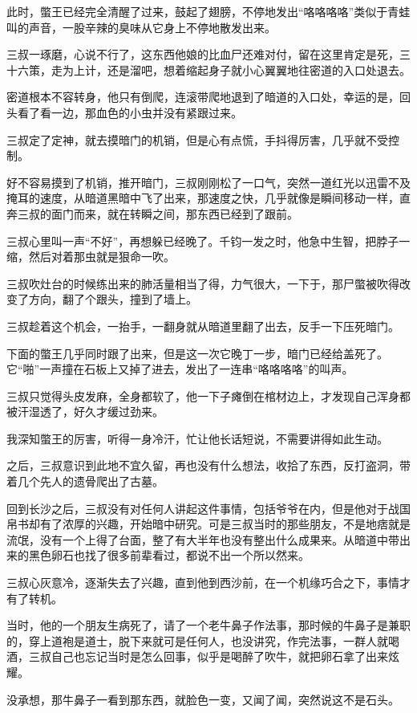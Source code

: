 此时，蟞王已经完全清醒了过来，鼓起了翅膀，不停地发出“咯咯咯咯”类似于青蛙叫的声音，一股辛辣的臭味从它身上不停地散发出来。

三叔一琢磨，心说不行了，这东西他娘的比血尸还难对付，留在这里肯定是死，三十六策，走为上计，还是溜吧，想着缩起身子就小心翼翼地往密道的入口处退去。

密道根本不容转身，他只有倒爬，连滚带爬地退到了暗道的入口处，幸运的是，回头看了看一边，那血色的小虫并没有紧跟过来。

三叔定了定神，就去摸暗门的机销，但是心有点慌，手抖得厉害，几乎就不受控制。

好不容易摸到了机销，推开暗门，三叔刚刚松了一口气，突然一道红光以迅雷不及掩耳的速度，从暗道黑暗中飞了出来，那速度之快，几乎就像是瞬间移动一样，直奔三叔的面门而来，就在转瞬之间，那东西已经到了跟前。

三叔心里叫一声“不好”，再想躲已经晚了。千钧一发之时，他急中生智，把脖子一缩，然后对着那虫就是狠命一吹。

三叔吹灶台的时候练出来的肺活量相当了得，力气很大，一下于，那尸蟞被吹得改变了方向，翻了个跟头，撞到了墙上。

三叔趁着这个机会，一抬手，一翻身就从暗道里翻了出去，反手一下压死暗门。

下面的蟞王几乎同时跟了出来，但是这一次它晚丁一步，暗门已经给盖死了。它“啪”一声撞在石板上又掉了进去，发出了一连串“咯咯咯咯”的叫声。

三叔只觉得头皮发麻，全身都软了，他一下子瘫倒在棺材边上，才发现自己浑身都被汗湿透了，好久才缓过劲来。

我深知蟞王的厉害，听得一身冷汗，忙让他长话短说，不需要讲得如此生动。

之后，三叔意识到此地不宜久留，再也没有什么想法，收拾了东西，反打盗洞，带着几个先人的遗骨爬出了古墓。

回到长沙之后，三叔没有对任何人讲起这件事情，包括爷爷在内，但是他对于战国帛书却有了浓厚的兴趣，开始暗中研究。可是三叔当时的那些朋友，不是地痞就是流氓，没有一个上得了台面，整了有大半年也没有整出什么成果来。从暗道中带出来的黑色卵石也找了很多前辈看过，都说不出一个所以然来。

三叔心灰意冷，逐渐失去了兴趣，直到他到西沙前，在一个机缘巧合之下，事情才有了转机。

当时，他的一个朋友生病死了，请了一个老牛鼻子作法事，那时候的牛鼻子是兼职的，穿上道袍是道士，脱下来就可是任何人，也没讲究，作完法事，一群人就喝酒，三叔自己也忘记当时是怎么回事，似乎是喝醉了吹牛，就把卵石拿了出来炫耀。

没承想，那牛鼻子一看到那东西，就脸色一变，又闻了闻，突然说这不是石头。

